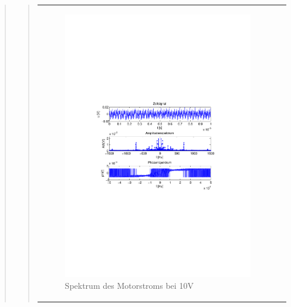 \begin{quote}
\begin{quote}
\begin{center}
\begin{tabular}{ll}
\begin{minipage}{0.6\textwidth}
                        \begin{figure}[H]
                            \label{fig:}
                            \includegraphics[scale=0.63, trim = 3cm 9cm 3cm
                            8.5cm, clip]{./Bilder/Termin7/ampl_spektrum_messung1}
                            \caption{Spektrum des Motorstroms bei 10V}
                        \end{figure}
    
                    \end{minipage}
                    \begin{minipage}{0.6\textwidth}
    

\end{minipage}
\end{tabular}
\end{center}
\end{quote}
\end{quote}
